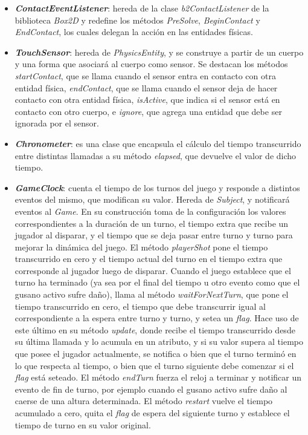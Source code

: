 \begin{itemize}
	\item \textbf{\textit{ContactEventListener}}: hereda de la clase \textit{b2ContactListener} de la biblioteca \textit{Box2D} y redefine los métodos \textit{PreSolve}, \textit{BeginContact} y \textit{EndContact}, los cuales delegan la acción en las entidades físicas.
	
	\item \textbf{\textit{TouchSensor}}: hereda de \textit{PhysicsEntity}, y se construye a partir de un cuerpo y una forma que asociará al cuerpo como sensor. Se destacan los métodos \textit{startContact}, que se llama cuando el sensor entra en contacto con otra entidad física, \textit{endContact}, que se llama cuando el sensor deja de hacer contacto con otra entidad física, \textit{isActive}, que indica si el sensor está en contacto con otro cuerpo, e \textit{ignore}, que agrega una entidad que debe ser ignorada por el sensor.
	
	\item \textbf{\textit{Chronometer}}: es una clase que encapsula el cálculo del tiempo transcurrido entre distintas llamadas a su método \textit{elapsed}, que devuelve el valor de dicho tiempo.
	
	\item \textbf{\textit{GameClock}}: cuenta el tiempo de los turnos del juego y responde a distintos eventos del mismo, que modifican su valor. Hereda de \textit{Subject}, y notificará eventos al \textit{Game}. En su construcción toma de la configuración los valores correspondientes a la duración de un turno, el tiempo extra que recibe un jugador al disparar, y el tiempo que se deja pasar entre turno y turno para mejorar la dinámica del juego. El método \textit{playerShot} pone el tiempo transcurrido en cero y el tiempo actual del turno en el tiempo extra que corresponde al jugador luego de disparar. Cuando el juego establece que el turno ha terminado (ya sea por el final del tiempo u otro evento como que el gusano activo sufre daño), llama al método \textit{waitForNextTurn}, que pone el tiempo transcurrido en cero, el tiempo que debe transcurrir igual al correspondiente a la espera entre turno y turno, y setea un \textit{flag}. Hace uso de este último en su método \textit{update}, donde recibe el tiempo transcurrido desde su última llamada y lo acumula en un atributo, y si su valor supera al tiempo que posee el jugador actualmente, se notifica o bien que el turno terminó en lo que respecta al tiempo, o bien que el turno siguiente debe comenzar si el \textit{flag} está seteado. El método \textit{endTurn} fuerza el reloj a terminar y notificar un evento de fin de turno, por ejemplo cuando el gusano activo sufre daño al caerse de una altura determinada. El método \textit{restart} vuelve el tiempo acumulado a cero, quita el \textit{flag} de espera del siguiente turno y establece el tiempo de turno en su valor original.
	

\end{itemize}
